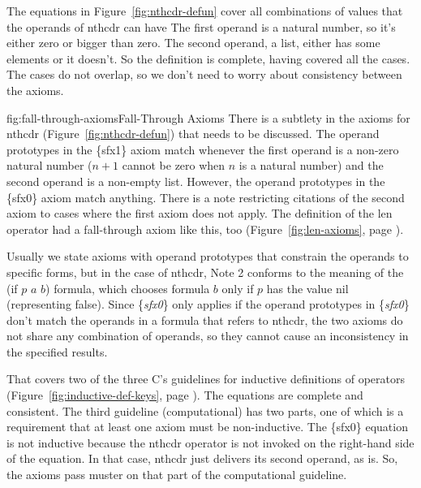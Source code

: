 
The equations in Figure~\ref{fig:nthcdr-defun} cover all combinations
of values that the operands of \textsf{nthcdr} can have
The first operand is a natural number,
so it's either zero or bigger than zero.
The second operand, a list, either has some elements or it doesn't.
So the definition is complete, having covered all the cases.
The cases do not overlap, so we don't need to worry about
consistency between the axioms.

\begin{aside}{fig:fall-through-axioms}{Fall-Through Axioms}
There is a subtlety in the axioms for \textsf{nthcdr} (Figure~\ref{fig:nthcdr-defun})
that needs to be discussed.
The operand prototypes in the
\{sfx1\} axiom match whenever the first operand is a non-zero natural number
($n+1$ cannot be zero when $n$ is a natural number)
and the second operand is a non-empty list.
However, the operand prototypes in the \{sfx0\} axiom match anything.
There is a note restricting
citations of the second axiom to cases
where the first axiom does not apply.
The definition of the \textsf{len} operator
had a fall-through axiom like this, too
(Figure~\ref{fig:len-axioms}, page \pageref{fig:len-axioms}).

Usually we state axioms with operand prototypes that constrain
the operands to specific forms,
but in the case of \textsf{nthcdr}, Note 2 conforms to the meaning
of the \textsf{(if $p$ $a$ $b$)} formula, which chooses formula $b$
only if $p$ has the value \textsf{nil} (representing false).
Since \{\emph{sfx0}\} only applies if the operand prototypes in
\{\emph{sfx0}\} don't match the operands in a formula that refers to \textsf{nthcdr},
the two axioms do not share any combination of operands, so they cannot
cause an inconsistency in the specified results.
\end{aside}

That covers two of the three C's guidelines for inductive definitions of operators
(Figure~\ref{fig:inductive-def-keys}, page \pageref{fig:inductive-def-keys}).
The equations are complete and consistent.
The third guideline (computational) has two parts, one of which is
a requirement that at least one axiom must be non-inductive.
The \{sfx0\} equation is not inductive because the \textsf{nthcdr} operator
is not invoked on the right-hand side of the equation.
In that case, \textsf{nthcdr} just delivers its second operand, as is.
So, the axioms pass muster on that part of the computational guideline.

